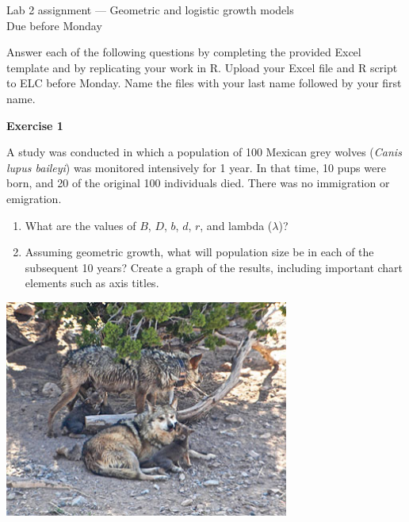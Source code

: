 \documentclass[12pt]{article}\usepackage[]{graphicx}\usepackage[]{color}
\begin{document}
{
  \Large
  \centering
  Lab 2 assignment --- Geometric and logistic growth models \\
  Due before Monday \par
}

Answer each of the following questions by completing the provided Excel 
template and by replicating your work in R. Upload your Excel file and R script to 
ELC before Monday. Name the files with your last name followed by your first name. \\

\vspace{12pt}

{\bf Exercise 1 \\}

A study was conducted in which a population of 100 Mexican grey wolves
({\it Canis lupus baileyi}) was monitored intensively for 1 year. In
that time, 10 pups were born, and 20 of the original 100 individuals 
died. There was no immigration or emigration.  

\begin{enumerate}
  \item What are the values of $B$, $D$, $b$, $d$, $r$, and lambda
    ($\lambda$)?
  \item Assuming geometric growth, what will population size be in
    each of the subsequent 10 years? Create a graph of the results,
    including important chart elements such as axis titles.
\end{enumerate}

\vspace{24pt}

{
  \centering
  \includegraphics[width=0.7\textwidth]{figs/Coronadopack2} \\
}


\clearpage

\end{document}
